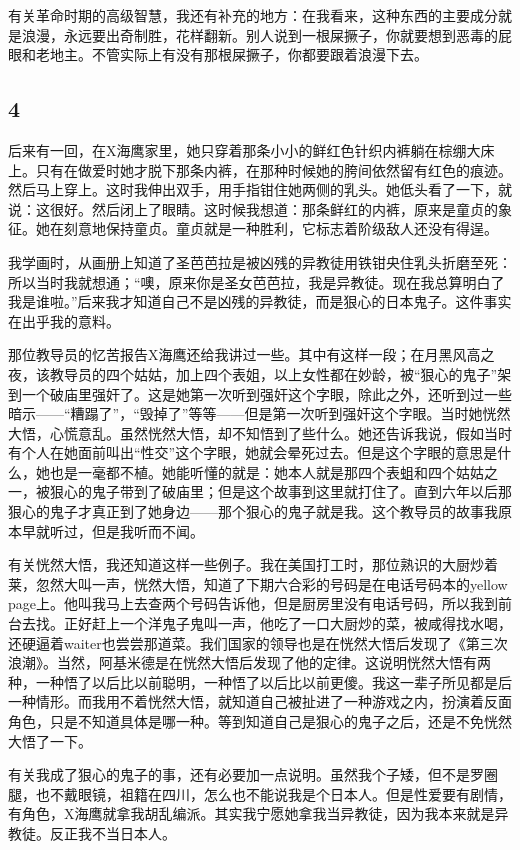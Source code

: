 有关革命时期的高级智慧，我还有补充的地方：在我看来，这种东西的主要成分就是浪漫，永远要出奇制胜，花样翻新。别人说到一根屎撅子，你就要想到恶毒的屁眼和老地主。不管实际上有没有那根屎撅子，你都要跟着浪漫下去。 

\subsection{4} 

后来有一回，在X海鹰家里，她只穿着那条小小的鲜红色针织内裤躺在棕绷大床上。只有在做爱时她才脱下那条内裤，在那种时候她的胯间依然留有红色的痕迹。然后马上穿上。这时我伸出双手，用手指钳住她两侧的乳头。她低头看了一下，就说：这很好。然后闭上了眼睛。这时候我想道：那条鲜红的内裤，原来是童贞的象征。她在刻意地保持童贞。童贞就是一种胜利，它标志着阶级敌人还没有得逞。 

我学画时，从画册上知道了圣芭芭拉是被凶残的异教徒用铁钳央住乳头折磨至死：所以当时我就想通；“噢，原来你是圣女芭芭拉，我是异教徒。现在我总算明白了我是谁啦。”后来我才知道自己不是凶残的异教徒，而是狠心的日本鬼子。这件事实在出乎我的意料。 

那位教导员的忆苦报告X海鹰还给我讲过一些。其中有这样一段；在月黑风高之夜，该教导员的四个姑姑，加上四个表姐，以上女性都在妙龄，被“狠心的鬼子”架到一个破庙里强奸了。这是她第一次听到强奸这个字眼，除此之外，还听到过一些暗示——“糟蹋了”，“毁掉了”等等——但是第一次听到强奸这个字眼。当时她恍然大悟，心慌意乱。虽然恍然大悟，却不知悟到了些什么。她还告诉我说，假如当时有个人在她面前叫出“性交”这个字眼，她就会晕死过去。但是这个字眼的意思是什么，她也是一毫都不植。她能听懂的就是：她本人就是那四个表蛆和四个姑姑之一，被狠心的鬼子带到了破庙里；但是这个故事到这里就打住了。直到六年以后那狠心的鬼子才真正到了她身边——那个狠心的鬼子就是我。这个教导员的故事我原本早就听过，但是我听而不闻。 

有关恍然大悟，我还知道这样一些例子。我在美国打工时，那位熟识的大厨炒着莱，忽然大叫一声，恍然大悟，知道了下期六合彩的号码是在电话号码本的yellow page上。他叫我马上去查两个号码告诉他，但是厨房里没有电话号码，所以我到前台去找。正好赶上一个洋鬼子鬼叫一声，他吃了一口大厨炒的菜，被咸得找水喝，还硬逼着waiter也尝尝那道菜。我们国家的领导也是在恍然大悟后发现了《第三次浪潮》。当然，阿基米德是在恍然大悟后发现了他的定律。这说明恍然大悟有两种，一种悟了以后比以前聪明，一种悟了以后比以前更傻。我这一辈子所见都是后一种情形。而我用不着恍然大悟，就知道自己被扯进了一种游戏之内，扮演着反面角色，只是不知道具体是哪一种。等到知道自己是狠心的鬼子之后，还是不免恍然大悟了一下。 

有关我成了狠心的鬼子的事，还有必要加一点说明。虽然我个子矮，但不是罗圈腿，也不戴眼镜，祖籍在四川，怎么也不能说我是个日本人。但是性爱要有剧情，有角色，X海鹰就拿我胡乱编派。其实我宁愿她拿我当异教徒，因为我本来就是异教徒。反正我不当日本人。 

